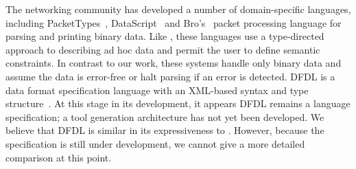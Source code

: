 



The networking community has developed a number of domain-specific
languages, including PacketTypes~\cite{sigcomm00},
DataScript~\cite{gpce02} and Bro's~\cite{paxson:bro} packet processing
language for parsing and printing binary data.  Like \padsml{}, these
languages use a type-directed approach to describing ad hoc data and
permit the user to define semantic constraints.  In contrast to our
work, these systems handle only binary data and assume the data is
error-free or halt parsing if an error is detected. DFDL is a data
format specification language with an XML-based syntax and type
structure~\cite{dfdl-proposal,dfdl-primer}. At this stage in its
development, it appears DFDL remains a language specification; a tool
generation architecture has not yet been developed. We believe that
DFDL is similar in its expressiveness to \padsc{}.  However, because
the specification is still under development, we cannot give a more
detailed comparison at this point.

